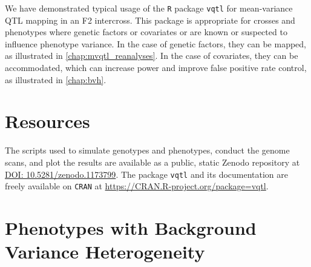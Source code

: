 We have demonstrated typical usage of the \texttt{R} package \texttt{vqtl} for mean-variance QTL mapping in an F2 intercross.
This package is appropriate for crosses and phenotypes where genetic factors or covariates or are known or suspected to influence phenotype variance.
In the case of genetic factors, they can be mapped, as illustrated in \autoref{chap:mvqtl_reanalyses}.
In the case of covariates, they can be accommodated, which can increase power and improve false positive rate control, as illustrated in \autoref{chap:bvh}.

\section{Resources}
The scripts used to simulate genotypes and phenotypes, conduct the genome scans, and plot the results are available as a public, static Zenodo repository at \url{DOI: 10.5281/zenodo.1173799}.
The package \texttt{vqtl} and its documentation are freely available on \texttt{CRAN} at \url{https://CRAN.R-project.org/package=vqtl}.



\FloatBarrier
\clearpage
\section{Phenotypes with Background Variance Heterogeneity}


